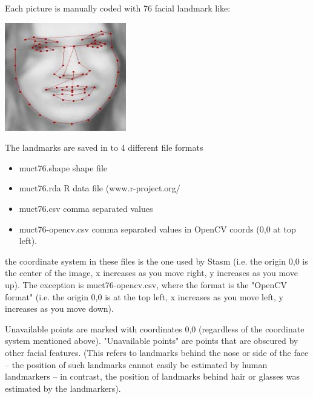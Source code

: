 \documentclass[11pt]{article}
\begin{document}
Each picture is manually coded with 76 facial landmark like:
\begin{center}
\includegraphics[width=.9\linewidth]{./images/landmarks.jpg}
\end{center}


The landmarks are saved in to 4 different file formats

\begin{itemize}
\item muct76.shape       shape file \cite{milborrow2009active}
\item muct76.rda         R data file (www.r-project.org/
\item muct76.csv         comma separated values
\item muct76-opencv.csv  comma separated values in OpenCV coords (0,0 at top left).
\end{itemize}


the coordinate system in these files is the one used by Stasm (i.e. the
origin 0,0 is the center of the image, x increases as you move right, y
increases as you move up).  The exception is muct76-opencv.csv, where the
format is the "OpenCV format" (i.e. the origin 0,0 is at the top left, x
increases as you move left, y increases as you move down). 

Unavailable points are marked with coordinates 0,0 (regardless of the
coordinate system mentioned above).  "Unavailable points" are points
that are obscured by other facial features.  (This refers to landmarks
behind the nose or side of the face -- the position of such landmarks
cannot easily be estimated by human landmarkers -- in contrast, the
position of landmarks behind hair or glasses was estimated by the
landmarkers).  
\end{document}
